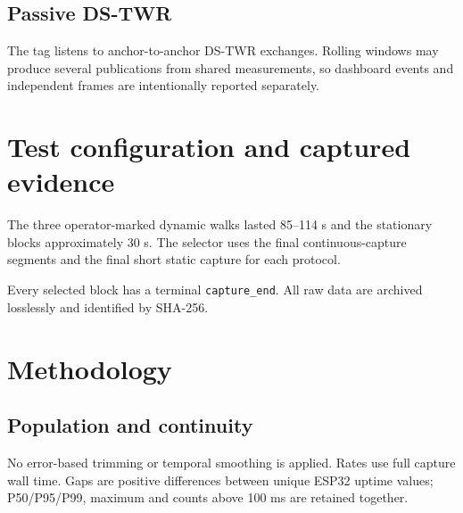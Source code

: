 \documentclass[10pt,a4paper]{article}
\begin{document}
\subsection{Passive DS-TWR}
The tag listens to anchor-to-anchor DS-TWR exchanges. Rolling windows may
produce several publications from shared measurements, so dashboard events and
independent frames are intentionally reported separately.

\section{Test configuration and captured evidence}
The three operator-marked dynamic walks lasted 85--114 s and the stationary
blocks approximately 30 s. The selector uses the final continuous-capture
segments and the final short static capture for each protocol.
\begin{center}\scriptsize{}\end{center}
Every selected block has a terminal \texttt{capture\_end}. All raw data are
archived losslessly and identified by SHA-256.

\section{Methodology}
\subsection{Population and continuity}
No error-based trimming or temporal smoothing is applied. Rates use full
capture wall time. Gaps are positive differences between unique ESP32 uptime
values; P50/P95/P99, maximum and counts above 100 ms are retained together.
\end{document}
